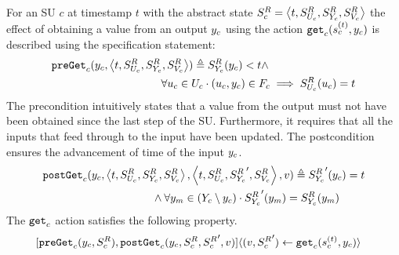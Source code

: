 \begin{definition}\label{def:getout}  
  For an SU $c$ at timestamp $t$ with the abstract state $S^{R}_{c} =  \left\langle t,S^{R}_{U_{c}}, S^{R}_{Y_{c}}, S^{R}_{V_c} \right\rangle $ the effect of obtaining a value from an output $y_{c}$ using the action $\mathtt{get}_{c}(s_{c}^{(t)},y_{c})$ is described using the specification statement:
  \begin{align*}
    &\mathtt{preGet}_{c}(y_{c},  \left\langle t,S^{R}_{U_{c}}, S^{R}_{Y_{c}}, S^{R}_{V_c} \right\rangle ) \triangleq
    S^{R}_{Y_{c}}(y_{c}) < t \land \nonumber \\
    & \qquad \qquad \qquad \qquad \qquad 
    \forall u_{c} \in U_{c} \cdot (u_{c}, y_{c}) \in F_{c} 
    \implies S^{R}_{U_{c}}(u_{c}) = t 
  \end{align*}
  The precondition intuitively states that a value from the output must not have been obtained since the last step of the SU.
  Furthermore, it requires that all the inputs that feed through to the input have been updated.
  The postcondition ensures the advancement of time of the input $y_{c}$.
  \begin{align*}
    &\mathtt{postGet}_{c}(y_{c},  \left\langle t,S^{R}_{U_{c}}, S^{R}_{Y_{c}}, S^{R}_{V_c} \right\rangle , 
     \left\langle t,S^{R}_{U_{c}}, {S^{R}_{Y_{c}}}', S^{R}_{V_c} \right\rangle , v) \triangleq 
    {S^{R}_{Y_{c}}}'(y_{c}) = t \nonumber \\
    & \qquad \qquad \qquad \qquad \qquad 
    \land 
    \forall y_{m} \in (Y_{c} \setminus y_{c}) \cdot 
    {S^{R}_{Y_{c}}}'(y_{m}) =
    S^{R}_{Y_{c}}(y_{m})
  \end{align*}
  The $\mathtt{get}_{c}$ action satisfies the following property.
  \begin{align*}
    &[\mathtt{preGet}_{c}(y_{c}, S^{R}_{c}), 
    \mathtt{postGet}_{c}(y_{c}, S^{R}_{c}, {S^{R}_{c}}', v)] 
    \langle (v, {S^{R}_{c}}') \gets \mathtt{get}_{c}(s_{c}^{(t)},y_{c}) \rangle \nonumber
  \end{align*}
\end{definition}

